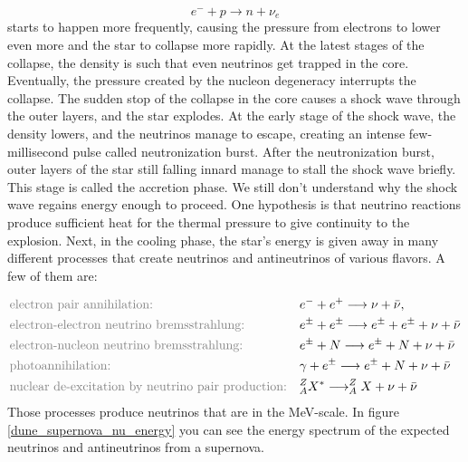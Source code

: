 \begin{equation}
    e^{-} + p \longrightarrow n + \nu_e
\end{equation}
starts to happen more frequently, causing the pressure from electrons to lower even more and the star to collapse more rapidly. At the latest stages of the collapse, the density is such that even neutrinos get trapped in the core. Eventually, the pressure created by the nucleon degeneracy interrupts the collapse. The sudden stop of the collapse in the core causes a shock wave through the outer layers, and the star explodes. At the early stage of the shock wave, the density lowers, and the neutrinos manage to escape, creating an intense few-millisecond pulse called neutronization burst. 
After the neutronization burst, outer layers of the star still falling innard manage to stall the shock wave briefly. This stage is called the accretion phase. We still don't understand why the shock wave regains energy enough to proceed. One hypothesis is that neutrino reactions produce sufficient heat for the thermal pressure to give continuity to the explosion. 
Next, in the cooling phase, the star's energy is given away in many different processes that create neutrinos and antineutrinos of various flavors. A few of them are:

\begin{align}
    & \text{{\color{gray} electron pair annihilation:}}
    && e^{-} + e^{+} \longrightarrow \nu + \bar{\nu}, \\
    & \text{{\color{gray}electron-electron neutrino bremsstrahlung:}}
    && e^{\pm} + e^{\pm} \longrightarrow e^{\pm} + e^{\pm} + \nu + \bar{\nu} \\
    & \text{{\color{gray}electron-nucleon neutrino bremsstrahlung:}}
    && e^{\pm} + N \longrightarrow e^{\pm} + N + \nu + \bar{\nu} \\
    & \text{{\color{gray}photoannihilation:}}
    && \gamma + e^{\pm} \longrightarrow e^{\pm} + N + \nu + \bar{\nu} \\
    & \text{{\color{gray}nuclear de-excitation by neutrino pair production:}} 
    && ^{Z}_{A}X^{*} \longrightarrow ^{Z}_{A}X + \nu + \bar{\nu}
\end{align}
Those processes produce neutrinos that are in the MeV-scale. In figure \ref{dune_supernova_nu_energy} you can see the energy spectrum of the expected neutrinos and antineutrinos from a supernova. 

